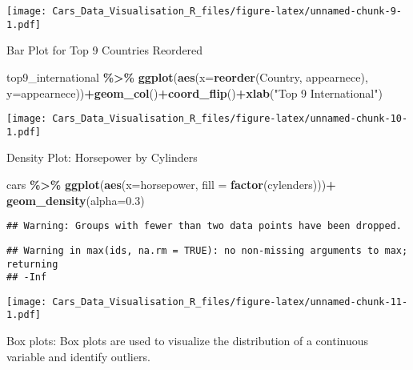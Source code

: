 \documentclass[
]{article}
\newenvironment{Shaded}{\begin{snugshade}}{\end{snugshade}}
\newcommand{\AttributeTok}[1]{\textcolor[rgb]{0.13,0.29,0.53}{#1}}
\newcommand{\DocumentationTok}[1]{\textcolor[rgb]{0.56,0.35,0.01}{\textbf{\textit{#1}}}}
\newcommand{\FloatTok}[1]{\textcolor[rgb]{0.00,0.00,0.81}{#1}}
\newcommand{\FunctionTok}[1]{\textcolor[rgb]{0.13,0.29,0.53}{\textbf{#1}}}
\newcommand{\NormalTok}[1]{#1}
\newcommand{\SpecialCharTok}[1]{\textcolor[rgb]{0.81,0.36,0.00}{\textbf{#1}}}
\newcommand{\StringTok}[1]{\textcolor[rgb]{0.31,0.60,0.02}{#1}}
\begin{document}
\texttt{[image: Cars\_Data\_Visualisation\_R\_files/figure-latex/unnamed-chunk-9-1.pdf]}

Bar Plot for Top 9 Countries Reordered

\begin{Shaded}
\begin{Highlighting}[]
\NormalTok{top9\_international }\SpecialCharTok{\%\textgreater{}\%} 
  \FunctionTok{ggplot}\NormalTok{(}\FunctionTok{aes}\NormalTok{(}\AttributeTok{x=}\FunctionTok{reorder}\NormalTok{(Country, appearnece), }\AttributeTok{y=}\NormalTok{appearnece))}\SpecialCharTok{+}\FunctionTok{geom\_col}\NormalTok{()}\SpecialCharTok{+}\FunctionTok{coord\_flip}\NormalTok{()}\SpecialCharTok{+}\FunctionTok{xlab}\NormalTok{(}\StringTok{"Top 9 International"}\NormalTok{)}
\end{Highlighting}
\end{Shaded}

\texttt{[image: Cars\_Data\_Visualisation\_R\_files/figure-latex/unnamed-chunk-10-1.pdf]}

Density Plot: Horsepower by Cylinders

\begin{Shaded}
\begin{Highlighting}[]
\NormalTok{cars }\SpecialCharTok{\%\textgreater{}\%} \FunctionTok{ggplot}\NormalTok{(}\FunctionTok{aes}\NormalTok{(}\AttributeTok{x=}\NormalTok{horsepower, }\AttributeTok{fill =} \FunctionTok{factor}\NormalTok{(cylenders)))}\SpecialCharTok{+} \FunctionTok{geom\_density}\NormalTok{(}\AttributeTok{alpha=}\FloatTok{0.3}\NormalTok{)}
\end{Highlighting}
\end{Shaded}

\begin{verbatim}
## Warning: Groups with fewer than two data points have been dropped.
\end{verbatim}

\begin{verbatim}
## Warning in max(ids, na.rm = TRUE): no non-missing arguments to max; returning
## -Inf
\end{verbatim}

\texttt{[image: Cars\_Data\_Visualisation\_R\_files/figure-latex/unnamed-chunk-11-1.pdf]}

Box plots: Box plots are used to visualize the distribution of a
continuous variable and identify outliers.

\begin{Shaded}
\end{Shaded}
\end{document}
